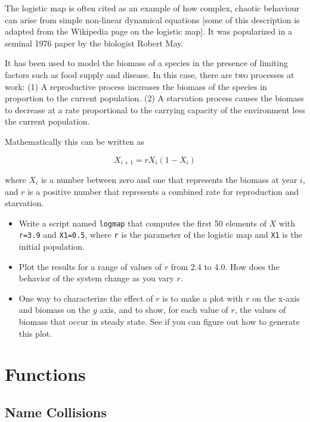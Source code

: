 \documentclass{book}
\begin{document}
\begin{ex}
The logistic map is often cited as an example of how complex, chaotic
behaviour can arise from simple non-linear dynamical equations [some
of this description is adapted from the Wikipedia page on the logistic
map]. It was popularized in a seminal 1976 paper by the biologist
Robert May.

It has been used to model the biomass of a
species in the presence of limiting factors such as food supply and
disease. In this case, there are two processes at work:
(1) A reproductive process increases the biomass of the species
in proportion to the current population.
(2) A starvation process causes the biomass to decrease at a rate
proportional to the carrying capacity of the environment less the
current population.

Mathematically this can be written as

\[ X_{i+1} = r X_i (1-X_i) \]

where $X_i$ is a number between zero and one that represents the
biomass at year $i$, and $r$ is a positive number that represents a
combined rate for reproduction and starvation.

\begin{itemize}

\item Write a script named {\tt logmap} that computes the first 50
elements of $X$ with {\tt r=3.9} and {\tt X1=0.5}, where
{\tt r} is the parameter of the logistic map and {\tt X1} is the
initial population.

\item Plot the results for a range of values of $r$ from 2.4 to 4.0.
How does the behavior of the system change as you vary $r$.

\item One way to characterize the effect of $r$ is to make a plot
with $r$ on the x-axis and biomass on the $y$ axis, and to show,
for each value of $r$, the values of biomass that occur in steady
state. See if you can figure out how to generate this plot.

\end{itemize}

\end{ex}


\chapter{Functions}

\section{Name Collisions}
\end{document}
